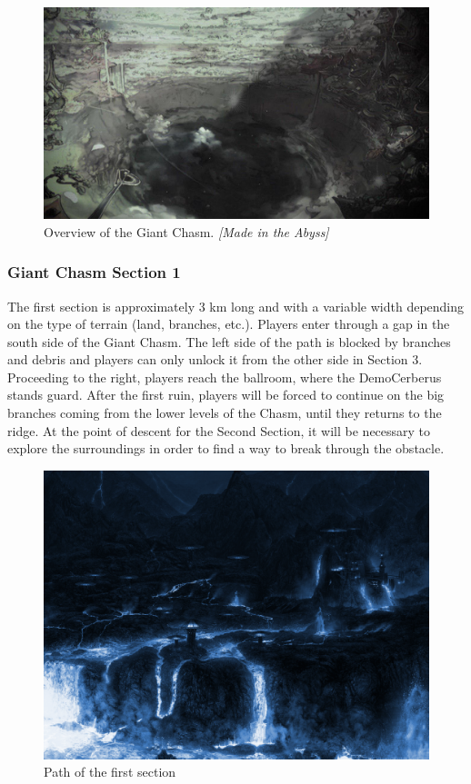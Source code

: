 \begin{figure}[H]
	\centering
	\includegraphics[width=0.8\linewidth]{images/visual_ref/15_giant_chasm/chasm_outside.jpg}
	\caption*{Overview of the Giant Chasm. \textit{[Made in the Abyss]}}
\end{figure}


\newpage
\subsubsection{Giant Chasm Section 1}
The first section is approximately 3 km long and with a variable width depending on the type of terrain (land, branches, etc.). Players enter through a gap in the south side of the Giant Chasm. The left side of the path is blocked by branches and debris and players can only unlock it from the other side in Section 3. Proceeding to the right, players reach the ballroom, where the DemoCerberus stands guard. After the first ruin, players will be forced to continue on the big branches coming from the lower levels of the Chasm, until they returns to the ridge. At the point of descent for the Second Section, it will be necessary to explore the surroundings in order to find a way to break through the obstacle.

\vspace*{0.3cm}
\begin{figure}[H]
	\centering
	\includegraphics[width=0.8\linewidth]{images/visual_ref/15_giant_chasm/chasm_section_1.png}
	\caption*{Path of the first section}
\end{figure}

